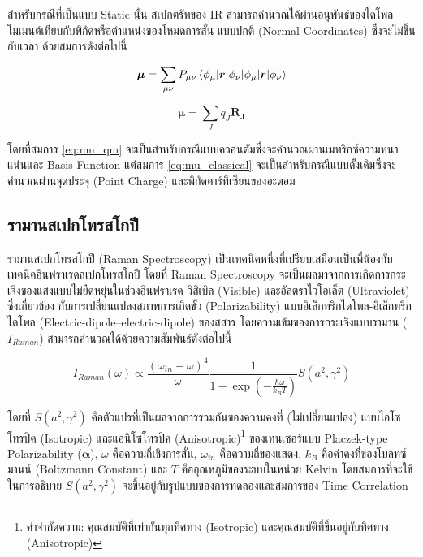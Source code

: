 สำหรับกรณีที่เป็นแบบ Static นั้น สเปกตรัทของ IR สามารถคำนวณได้ผ่านอนุพันธ์ของไดโพลโมเมนต์เทียบกับพิกัดหรือตำแหน่งของโหมดการสั่น%
แบบปกติ (Normal Coordinates) ซึ่งจะไม่ขึ้นกับเวลา ด้วยสมการดังต่อไปนี้

\begin{equation}\label{eq:mu_qm}
    \bm{\mu}= \sum_{\mu\nu} P_{\mu\nu} \braket{\phi_{\mu}|\bm{r}|\phi_{\nu}}
\end{equation}

\begin{equation}\label{eq:mu_classical}
    \bm{\mu}=\sum_{J} q_J \bm{R_J}
\end{equation}

โดยที่สมการ \ref{eq:mu_qm} จะเป็นสำหรับกรณีแบบควอนตัมซึ่งจะคำนวณผ่านเมทริกซ์ความหนาแน่นและ Basis Function แต่สมการ 
\ref{eq:mu_classical} จะเป็นสำหรับกรณีแบบดั้งเดิมซึ่งจะคำนวณผ่านจุดประจุ (Point Charge) และพิกัดคาร์ทีเซียนของอะตอม

\subsection{รามานสเปกโทรสโกปี}
\label{ssec:raman_spectro}

รามานสเปกโทรสโกปี (Raman Spectroscopy) เป็นเทคนิคหนึ่งที่เปรียบเสมือนเป็นพี่น้องกับเทคนิคอินฟราเรดสเปกโทรสโกปี โดยที่ Raman Spectroscopy 
จะเป็นผลมาจากการเกิดการกระเจิงของแสงแบบไม่ยืดหยุ่นในช่วงอินฟราเรด วิสิเบิล (Visible) และอัลตราไวโอเล็ต (Ultraviolet) ซึ่งเกี่ยวข้อง%
กับการเปลี่ยนแปลงสภาพการเกิดขั้ว (Polarizability) แบบอิเล็กทริกไดโพล-อิเล็กทริกไดโพล (Electric-dipole--electric-dipole) 
ของสสาร โดยความเข้มของการกระเจิงแบบรามาน ($I_{Raman}$) สามารถคำนวณได้ด้วยความสัมพันธ์ดังต่อไปนี้\autocite{thomas2013}

\begin{equation}\label{eq:Raman_corr}
    I_{Raman} (\omega) \propto \frac{(\omega_{in}-\omega)^4}{\omega} 
    \frac{1}{1-\exp(-\frac{\hbar\omega}{k_{B}T})}S(a^{2}, \gamma^{2})
\end{equation}

\noindent โดยที่ $S(a^{2}, \gamma^{2})$ คือตัวแปรที่เป็นผลจากการรวมกันของความคงที่ (ไม่เปลี่ยนแปลง) แบบไอโซโทรปิค (Isotropic) 
และแอนิโซโทรปิค (Anisotropic)\footnote{คำจำกัดความ: คุณสมบัติที่เท่ากันทุกทิศทาง (Isotropic) และคุณสมบัติที่ขึ้นอยู่กับทิศทาง 
(Anisotropic)} ของเทนเซอร์แบบ Placzek-type Polarizability ($\bm{\alpha}$)\autocite{jensen2005}, $\omega$ 
คือความถี่เชิงการสั่น, $\omega_{in}$ คือความถี่ของแสดง, $k_{B}$ คือค่าคงที่ของโบลทซ์มานน์ (Boltzmann Constant) และ $T$ 
คืออุณหภูมิของระบบในหน่วย Kelvin โดยสมการที่จะใช้ในการอธิบาย $S(a^{2}, \gamma^{2})$ จะขึ้นอยู่กับรูปแบบของการทดลองและสมการของ 
Time Correlation\autocite{mattiat2021}

